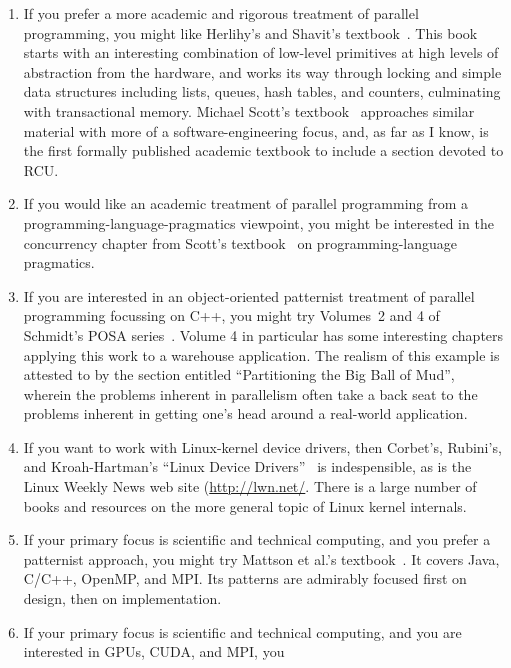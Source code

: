 \begin{enumerate}
\item	If you prefer a more academic and rigorous treatment of
	parallel programming,
	you might like Herlihy's and Shavit's
	textbook~\cite{HerlihyShavit2008Textbook}.
	This book starts with an interesting combination
	of low-level primitives at high levels of abstraction
	from the hardware, and works its way through locking
	and simple data structures including lists, queues,
	hash tables, and counters, culminating with transactional
	memory.
	Michael Scott's textbook~\cite{MichaelScott2013Textbook}
	approaches similar material with more of a
	software-engineering focus, and, as far as I know, is
	the first formally published academic textbook to include a
	section devoted to RCU.
\item	If you would like an academic treatment of parallel
	programming from a programming-language-pragmatics viewpoint,
	you might be interested in the concurrency chapter from Scott's
	textbook~\cite{MichaelScott2006Textbook}
	on programming-language pragmatics.
\item	If you are interested in an object-oriented patternist
	treatment of parallel programming focussing on C++,
	you might try Volumes~2 and 4 of Schmidt's POSA
	series~\cite{SchmidtStalRohnertBuschmann2000v2Textbook,
	BuschmannHenneySchmidt2007v4Textbook}.
	Volume 4 in particular has some interesting chapters
	applying this work to a warehouse application.
	The realism of this example is attested to by
	the section entitled ``Partitioning the Big Ball of Mud'',
	wherein the problems inherent in parallelism often
	take a back seat to the problems inherent in getting
	one's head around a real-world application.
\item	If you want to work with Linux-kernel device drivers,
	then Corbet's, Rubini's, and Kroah-Hartman's
	``Linux Device Drivers''~\cite{CorbetRubiniKroahHartman}
	is indespensible, as is the Linux Weekly News web site
	(\url{http://lwn.net/}.
	There is a large number of books and resources on
	the more general topic of Linux kernel internals.
\item	If your primary focus is scientific and technical computing,
	and you prefer a patternist approach,
	you might try Mattson et al.'s
	textbook~\cite{Mattson2005Textbook}.
	It covers Java, C/C++, OpenMP, and MPI.
	Its patterns are admirably focused first on design,
	then on implementation.
\item	If your primary focus is scientific and technical computing,
	and you are interested in GPUs, CUDA, and MPI, you

\end{enumerate}
